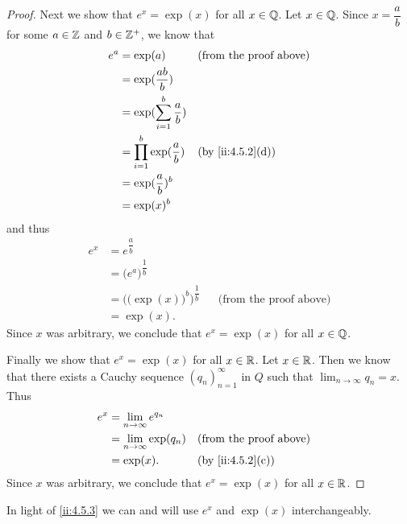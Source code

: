 \begin{proof}
  Next we show that \(e^x = \exp(x)\) for all \(x \in \mathbb{Q}\).
  Let \(x \in \mathbb{Q}\).
  Since \(x = \dfrac{a}{b}\) for some \(a \in \mathbb{Z}\) and \(b \in \mathbb{Z}^+\), we know that
  \begin{align*}
    e^a & = \exp(a)                            &  & \text{(from the proof above)} \\
        & = \exp(\dfrac{ab}{b})                                                   \\
        & = \exp(\sum_{i = 1}^b \dfrac{a}{b})                                     \\
        & = \prod_{i = 1}^b \exp(\dfrac{a}{b}) &  & \by{ii:4.5.2}[d]              \\
        & = \exp(\dfrac{a}{b})^b                                                  \\
        & = \exp(x)^b
  \end{align*}
  and thus
  \begin{align*}
    e^x & = e^{\dfrac{a}{b}}                                                                \\
        & = \big(e^a\big)^{\dfrac{1}{b}}                                                    \\
        & = \Big(\big(\exp(x)\big)^b\Big)^{\dfrac{1}{b}} &  & \text{(from the proof above)} \\
        & = \exp(x).
  \end{align*}
  Since \(x\) was arbitrary, we conclude that \(e^x = \exp(x)\) for all \(x \in \mathbb{Q}\).

  Finally we show that \(e^x = \exp(x)\) for all \(x \in \mathbb{R}\).
  Let \(x \in \mathbb{R}\).
  Then we know that there exists a Cauchy sequence \((q_n)_{n = 1}^\infty\) in \(Q\) such that \(\lim_{n \to \infty} q_n = x\).
  Thus
  \begin{align*}
    e^x & = \lim_{n \to \infty} e^{q_n}                                      \\
        & = \lim_{n \to \infty} \exp(q_n) &  & \text{(from the proof above)} \\
        & = \exp(x).                      &  & \by{ii:4.5.2}[c]
  \end{align*}
  Since \(x\) was arbitrary, we conclude that \(e^x = \exp(x)\) for all \(x \in \mathbb{R}\).
\end{proof}

\begin{note}
  In light of \cref{ii:4.5.3} we can and will use \(e^x\) and \(\exp(x)\) interchangeably.
\end{note}

